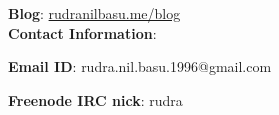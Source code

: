 \documentclass[preprint,12pt]{elsarticle}
\begin{document}
\textbf{Blog}: \href{http://rudranilbasu.me/blog/}{rudranilbasu.me/blog}\\

\textbf{Contact Information}:

\textbf{Email ID}: rudra.nil.basu.1996@gmail.com

\textbf{Freenode IRC nick}: rudra













\end{document}
